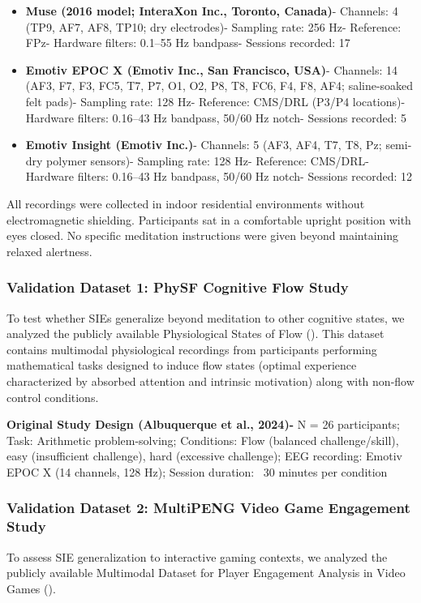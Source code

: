 \documentclass[11pt,a4paper]{article}
\begin{document}
\begin{itemize}
    \item \textbf{Muse (2016 model; InteraXon Inc., Toronto, Canada)}- Channels: 4 (TP9, AF7, AF8, TP10; dry electrodes)- Sampling rate: 256 Hz- Reference: FPz- Hardware filters: 0.1–55 Hz bandpass- Sessions recorded: 17

    \item \textbf{Emotiv EPOC X (Emotiv Inc., San Francisco, USA)}- Channels: 14 (AF3, F7, F3, FC5, T7, P7, O1, O2, P8, T8, FC6, F4, F8, AF4; saline-soaked felt pads)- Sampling rate: 128 Hz- Reference: CMS/DRL (P3/P4 locations)- Hardware filters: 0.16–43 Hz bandpass, 50/60 Hz notch- Sessions recorded: 5

    \item \textbf{Emotiv Insight (Emotiv Inc.)}- Channels: 5 (AF3, AF4, T7, T8, Pz; semi-dry polymer sensors)- Sampling rate: 128 Hz- Reference: CMS/DRL- Hardware filters: 0.16–43 Hz bandpass, 50/60 Hz notch- Sessions recorded: 12
\end{itemize}

All recordings were collected in indoor residential environments without electromagnetic shielding. Participants sat in a comfortable upright position with eyes closed. No specific meditation instructions were given beyond maintaining relaxed alertness.

\subsubsection{Validation Dataset 1: PhySF Cognitive Flow Study}
To test whether SIEs generalize beyond meditation to other cognitive states, we analyzed the publicly available Physiological States of Flow (\cite{albuquerque2024physf}). This dataset contains multimodal physiological recordings from participants performing mathematical tasks designed to induce flow states (optimal experience characterized by absorbed attention and intrinsic motivation) along with non-flow control conditions.

\textbf{Original Study Design (Albuquerque et al., 2024)-} N = 26 participants; Task: Arithmetic problem-solving; Conditions: Flow (balanced challenge/skill), easy (insufficient challenge), hard (excessive challenge); EEG recording: Emotiv EPOC X (14 channels, 128 Hz); Session duration: ~30 minutes per condition

\subsubsection{Validation Dataset 2: MultiPENG Video Game Engagement Study}
To assess SIE generalization to interactive gaming contexts, we analyzed the publicly available Multimodal Dataset for Player Engagement Analysis in Video Games (\cite{albuquerque2023multimodal}).
\end{document}
